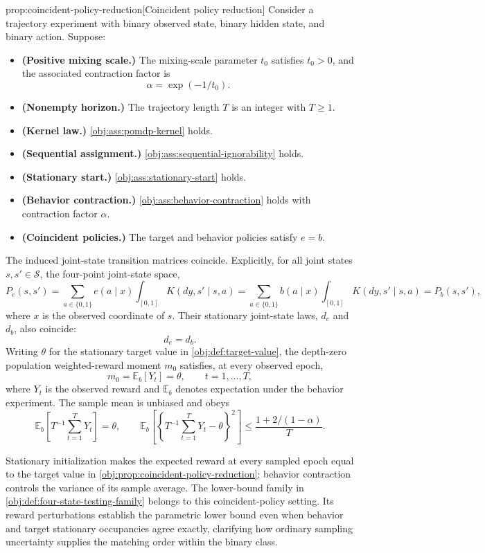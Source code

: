 \begin{propositionv}{prop:coincident-policy-reduction}[Coincident policy reduction]
Consider a trajectory experiment with binary observed state, binary hidden state, and binary action. Suppose:
\begin{itemize}
\item \textbf{(Positive mixing scale.)} The mixing-scale parameter \(t_0\) satisfies \(t_0>0\), and the associated contraction factor is
\[
\alpha=\exp(-1/t_0).
\]
\item \textbf{(Nonempty horizon.)} The trajectory length \(T\) is an integer with \(T\geq 1\).
\item \textbf{(Kernel law.)} \cref{obj:ass:pomdp-kernel} holds.
\item \textbf{(Sequential assignment.)} \cref{obj:ass:sequential-ignorability} holds.
\item \textbf{(Stationary start.)} \cref{obj:ass:stationary-start} holds.
\item \textbf{(Behavior contraction.)} \cref{obj:ass:behavior-contraction} holds with contraction factor \(\alpha\).
\item \textbf{(Coincident policies.)} The target and behavior policies satisfy \(e=b\).
\end{itemize}
The induced joint-state transition matrices coincide. Explicitly, for all joint states \(s,s'\in\mathcal S\), the four-point joint-state space,
\[
P_e(s,s')
=
\sum_{a\in\{0,1\}}e(a\mid x)
   \int_{[0,1]}K(dy,s'\mid s,a)
=
\sum_{a\in\{0,1\}}b(a\mid x)
   \int_{[0,1]}K(dy,s'\mid s,a)
=
P_b(s,s'),
\]
where \(x\) is the observed coordinate of \(s\). Their stationary joint-state laws, \(d_e\) and \(d_b\), also coincide:
\[
d_e=d_b.
\]
Writing \(\theta\) for the stationary target value in \cref{obj:def:target-value}, the depth-zero population weighted-reward moment \(m_0\) satisfies, at every observed epoch,
\[
m_0=\mathbb E_b[Y_t]=\theta,
\qquad t=1,\ldots,T,
\]
where \(Y_t\) is the observed reward and \(\mathbb E_b\) denotes expectation under the behavior experiment. The sample mean is unbiased and obeys
\[
\mathbb E_b\!\left[T^{-1}\sum_{t=1}^{T}Y_t\right]=\theta,
\qquad
\mathbb E_b\!\left[
\left\{T^{-1}\sum_{t=1}^{T}Y_t-\theta\right\}^{2}
\right]
\leq
\frac{1+2/(1-\alpha)}{T}.
\]
\end{propositionv}

Stationary initialization makes the expected reward at every sampled epoch equal to the target value in \cref{obj:prop:coincident-policy-reduction}; behavior contraction controls the variance of its sample average. The lower-bound family in \cref{obj:def:four-state-testing-family} belongs to this coincident-policy setting. Its reward perturbations establish the parametric lower bound even when behavior and target stationary occupancies agree exactly, clarifying how ordinary sampling uncertainty supplies the matching order within the binary class.
